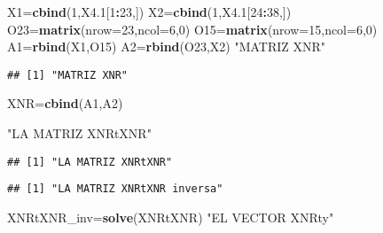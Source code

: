 \documentclass[
]{article}
\newenvironment{Shaded}{\begin{snugshade}}{\end{snugshade}}
\newcommand{\DataTypeTok}[1]{\textcolor[rgb]{0.13,0.29,0.53}{#1}}
\newcommand{\DecValTok}[1]{\textcolor[rgb]{0.00,0.00,0.81}{#1}}
\newcommand{\FloatTok}[1]{\textcolor[rgb]{0.00,0.00,0.81}{#1}}
\newcommand{\KeywordTok}[1]{\textcolor[rgb]{0.13,0.29,0.53}{\textbf{#1}}}
\newcommand{\NormalTok}[1]{#1}
\newcommand{\OperatorTok}[1]{\textcolor[rgb]{0.81,0.36,0.00}{\textbf{#1}}}
\newcommand{\StringTok}[1]{\textcolor[rgb]{0.31,0.60,0.02}{#1}}
\begin{document}
\begin{Shaded}
\begin{Highlighting}[]
\NormalTok{X1=}\KeywordTok{cbind}\NormalTok{(}\DecValTok{1}\NormalTok{,X4}\FloatTok{.1}\NormalTok{[}\DecValTok{1}\OperatorTok{:}\DecValTok{23}\NormalTok{,])}
\NormalTok{X2=}\KeywordTok{cbind}\NormalTok{(}\DecValTok{1}\NormalTok{,X4}\FloatTok{.1}\NormalTok{[}\DecValTok{24}\OperatorTok{:}\DecValTok{38}\NormalTok{,])}
\NormalTok{O23=}\KeywordTok{matrix}\NormalTok{(}\DataTypeTok{nrow=}\DecValTok{23}\NormalTok{,}\DataTypeTok{ncol=}\DecValTok{6}\NormalTok{,}\DecValTok{0}\NormalTok{)}
\NormalTok{O15=}\KeywordTok{matrix}\NormalTok{(}\DataTypeTok{nrow=}\DecValTok{15}\NormalTok{,}\DataTypeTok{ncol=}\DecValTok{6}\NormalTok{,}\DecValTok{0}\NormalTok{)}
\NormalTok{A1=}\KeywordTok{rbind}\NormalTok{(X1,O15)}
\NormalTok{A2=}\KeywordTok{rbind}\NormalTok{(O23,X2)}
\StringTok{"MATRIZ XNR"}
\end{Highlighting}
\end{Shaded}

\begin{verbatim}
## [1] "MATRIZ XNR"
\end{verbatim}

\begin{Shaded}
\begin{Highlighting}[]
\NormalTok{XNR=}\KeywordTok{cbind}\NormalTok{(A1,A2)}

\StringTok{"LA MATRIZ XNRtXNR"}
\end{Highlighting}
\end{Shaded}

\begin{verbatim}
## [1] "LA MATRIZ XNRtXNR"
\end{verbatim}

\begin{Shaded}
\end{Shaded}

\begin{verbatim}
## [1] "LA MATRIZ XNRtXNR inversa"
\end{verbatim}

\begin{Shaded}
\begin{Highlighting}[]
\NormalTok{XNRtXNR_inv=}\KeywordTok{solve}\NormalTok{(XNRtXNR)}
\StringTok{"EL VECTOR XNRty"}
\end{Highlighting}
\end{Shaded}
\end{document}
